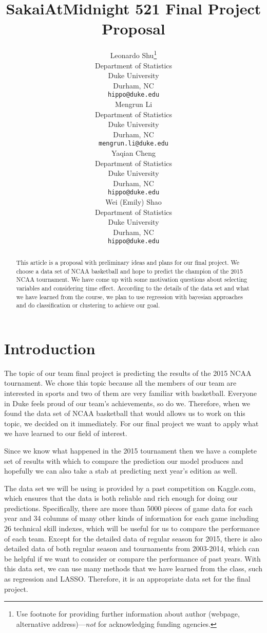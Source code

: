 \documentclass{article} %
\title{SakaiAtMidnight 521 Final Project Proposal}
\author{
Leonardo Shu\thanks{ Use footnote for providing further information
about author (webpage, alternative address)---\emph{not} for acknowledging
funding agencies.} \\
Department of Statistics\\
Duke University\\
Durham, NC \\
\texttt{hippo@duke.edu} \\
\And
Mengrun Li \\
Department of Statistics\\
Duke University\\
Durham, NC \\
\texttt{mengrun.li@duke.edu} \\
\AND
Yaqian Cheng \\
Department of Statistics\\
Duke University\\
Durham, NC \\
\texttt{hippo@duke.edu} \\
\And
Wei (Emily) Shao \\
Department of Statistics\\
Duke University\\
Durham, NC \\
\texttt{hippo@duke.edu} \\
}
\begin{document}
\maketitle

\begin{abstract}
This article is a proposal with preliminary ideas and plans for our final project. We choose a data set of NCAA basketball and hope to predict the champion of the 2015 NCAA tournament. We have come up with some motivation questions about selecting variables and considering time effect. According to the details of the data set and what we have learned from the course, we plan to use regression with bayesian approaches and do classification or clustering to achieve our goal.
\end{abstract}

\section{Introduction}

The topic of our team final project is predicting the results of the 2015 NCAA tournament. We chose this topic because all the members of our team are interested in sports and two of them are very familiar with basketball. Everyone in Duke feels proud of our team's achievements, so do we. Therefore, when we found the data set of NCAA basketball that would allows us to work on this topic, we decided on it immediately. For our final project we want to apply what we have learned to our field of interest.

Since we know what happened in the 2015 tournament then we have a complete set of results with which to compare the prediction our model produces and hopefully we can also take a stab at predicting next year's edition as well.

The data set we will be using is provided by a past competition on Kaggle.com, which ensures that the data is both reliable and rich enough for doing our predictions. Specifically, there are more than 5000 pieces of game data for each year and 34 columns of many other kinds of information for each game including 26 technical skill indexes, which will be useful for us to compare the performance of each team. Except for the detailed data of regular season for 2015, there is also detailed data of both regular season and tournaments from 2003-2014, which can be helpful if we want to consider or compare the performance of past years. With this data set, we can use many methods that we have learned from the class, such as regression and LASSO. Therefore, it is an appropriate data set for the final project.
\end{document}
